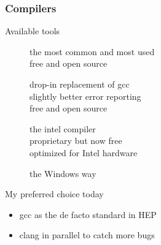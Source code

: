 \begin{frame}[fragile]
  \frametitle{Compilers}
  \begin{block}{Available tools}
    \begin{description}
    \item[\href{http://gcc.gnu.org/}{}]
        the most common and most used\\
        free and open source
    \item[\href{http://clang.llvm.org/}{}]
        drop-in replacement of gcc \\
        slightly better error reporting \\
        free and open source
    \item[\href{http://software.intel.com/en-us/intel-compilers}{}]
        the intel compiler \\
        proprietary but now free \\
        optimized for Intel hardware
    \item[\href{http://www.microsoft.com/}{}]
      the Windows way
    \end{description}
  \end{block}
  \begin{alertblock}{My preferred choice today}
    \begin{itemize}
      \item \alert{gcc} as the de facto standard in HEP
      \item \hspace{0pt}\alert{clang} in parallel to catch more bugs
    \end{itemize}
  \end{alertblock}
\end{frame}

